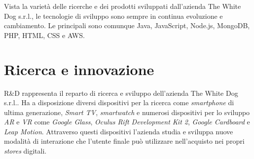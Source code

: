 Vista la varietà delle ricerche e dei prodotti sviluppati dall'azienda The White Dog s.r.l., le tecnologie di sviluppo sono sempre in continua evoluzione e cambiamento. Le principali sono comunque Java, JavaScript, Node.js, MongoDB, PHP, HTML, CSS e AWS.

\section{Ricerca e innovazione}

R\&D rappresenta il reparto di ricerca e sviluppo dell'azienda The White Dog s.r.l..
Ha a disposizione diversi dispositivi per la ricerca come \textit{smartphone} di ultima generazione, \textit{Smart TV}, \textit{smartwatch} e numerosi dispositivi per lo sviluppo \textit{AR} e \textit{VR} come \textit{Google Glass}, \textit{Oculus Rift Development Kit 2}, \textit{Google Cardboard} e \textit{Leap Motion}. Attraverso questi dispositivi l'azienda studia e sviluppa nuove modalità di interazione che l'utente finale può utilizzare nell'acquisto nei propri \textit{stores} digitali.
